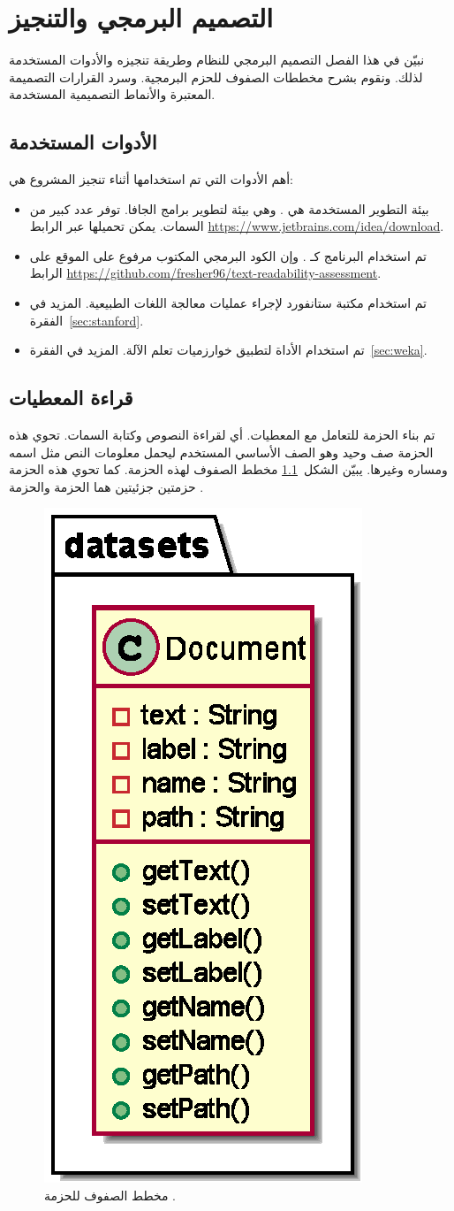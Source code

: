 

\chapter{التصميم البرمجي والتنجيز}
نبيّن في هذا الفصل التصميم البرمجي للنظام وطريقة تنجيزه والأدوات المستخدمة لذلك.
ونقوم بشرح مخططات الصفوف للحزم البرمجية.
وسرد القرارات التصميمة المعتبرة والأنماط التصميمية  المستخدمة.


\section{الأدوات المستخدمة}
أهم الأدوات التي تم استخدامها أثناء تنجيز المشروع هي:
\begin{itemize}
	\item 
	بيئة التطوير المستخدمة هي  .
	وهي بيئة لتطوير برامج الجافا.
	توفر عدد كبير من السمات.
	يمكن تحميلها عبر الرابط
	\url{https://www.jetbrains.com/idea/download}.
	
	\item
	تم استخدام البرنامج  كـ .
	وإن الكود البرمجي المكتوب مرفوع على الموقع  على الرابط
	\url{https://github.com/fresher96/text-readability-assessment}.
	
	\item
	تم استخدام مكتبة ستانفورد  لإجراء عمليات معالجة اللغات الطبيعية.
	المزيد في الفقرة~\ref{sec:stanford}.
	
	\item 
	تم استخدام الأداة  لتطبيق خوارزميات تعلم الآلة.
	المزيد في الفقرة~\ref{sec:weka}.
\end{itemize}


\section{قراءة المعطيات}
تم بناء الحزمة  للتعامل مع المعطيات. أي لقراءة النصوص وكتابة السمات.
تحوي هذه الحزمة صف وحيد  وهو الصف الأساسي المستخدم ليحمل معلومات النص مثل اسمه ومساره وغيرها.
يبيّن الشكل~\ref{fig:cd:datasets} مخطط الصفوف لهذه الحزمة.
كما تحوي هذه الحزمة حزمتين جزئيتين هما الحزمة  والحزمة .

\begin{figure}[htb]
	\centering
	\includegraphics[width=0.25\linewidth]{images/cd-datasets.eps}
	\caption{%
		مخطط الصفوف للحزمة .
	}
	\label{fig:cd:datasets}
\end{figure}

